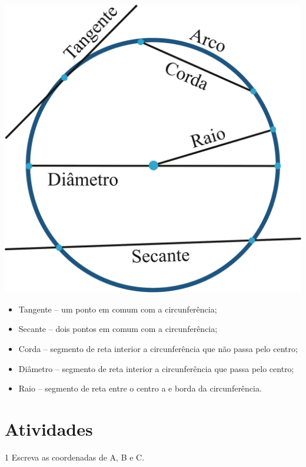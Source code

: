 {\includegraphics[width=.5\textwidth]{./ilustras-mat/modulo_10-elementos_da_circunferencia.png}

\begin{itemize}
\item
  Tangente -- um ponto em comum com a circunferência;
\item
  Secante -- dois pontos em comum com a circunferência;
\item
  Corda -- segmento de reta interior a circunferência que não passa pelo
  centro;
\item
  Diâmetro -- segmento de reta interior a circunferência que passa pelo
  centro;
\item
  Raio -- segmento de reta entre o centro a e borda da circunferência.
\end{itemize}
} 

\section*{Atividades}

\num{1} Escreva as coordenadas de A, B e C.

